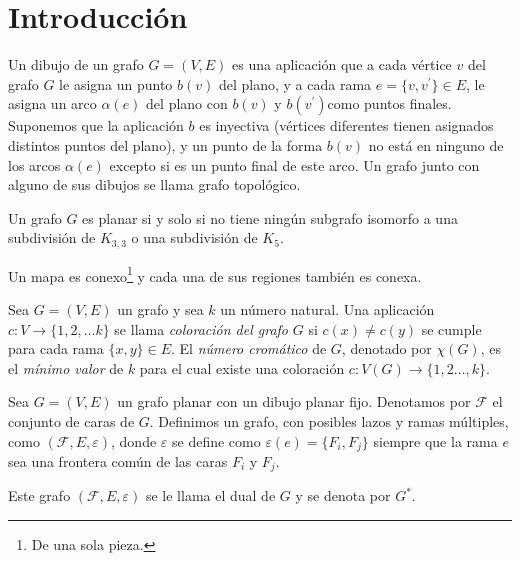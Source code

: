 \documentclass[3p,times,a4paper,twocolumn,authoryear]{elsarticle} %
\begin{document}
\tableofcontents

\section{Introducción}

\begin{definition}
Un dibujo de un grafo $G=(V,E)$ es una aplicación que a cada vértice $v$ del grafo $G$ le asigna un punto $b(v)$ del plano, y a cada rama $e=\{v,v^{\prime}\}\in E$, le asigna un arco $\alpha(e)$ del plano con $b(v)$ y $b(v^{\prime})$como puntos finales. Suponemos que la aplicación $b$ es inyectiva (vértices diferentes tienen asignados distintos puntos del plano), y un punto de la forma $b(v)$ no está en ninguno de los arcos $\alpha(e)$ excepto si es un punto final de este arco. Un grafo junto con alguno de sus dibujos se llama grafo topológico.
\end{definition}

\begin{theorem}
Un grafo $G$ es planar si y solo si no tiene ningún subgrafo isomorfo a una subdivisión de $K_{3,3}$ o una subdivisión de $K_5$.
\end{theorem}

\begin{definition}
Un mapa es conexo\footnote{De una sola pieza.} y cada una de sus regiones también es conexa.
\end{definition}

\begin{definition} 
Sea $G=(V,E)$ un grafo y sea $k$ un número natural. Una aplicación $c\colon V\to \{1,2,\ldots k\}$ se llama \emph{\color{DarkBlue}coloración del grafo} $G$ si $c(x)\neq c(y)$ se cumple para cada rama $\{x,y\}\in E$. \linebreak El \emph{\color{DarkBlue}número cromático} de $G$, denotado por $\chi(G)$, es el \emph{\color{red}mínimo valor} de $k$ para el cual existe una coloración $c\colon V(G)\to\{1,2\ldots,k\}$.
\end{definition}

\begin{definition}
Sea $G=(V,E)$ un grafo planar con un dibujo planar fijo. Denotamos por $\mathcal{F}$ el conjunto de caras de $G$. Definimos un grafo, con posibles lazos y ramas múltiples, como $(\mathcal{F},E,\varepsilon)$, donde $\varepsilon$ se define como $\varepsilon(e)=\{F_i,F_j\}$ siempre que la rama $e$ sea una frontera común de las caras $F_i$ y $F_j$.

Este grafo $\left(\mathcal{F},E,\varepsilon\right)$ se le llama el dual de $G$ y se denota por $G^{\ast}$.	
\end{definition}
\end{document}
